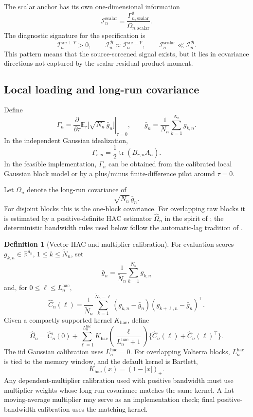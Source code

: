 \documentclass[11pt,a4paper]{amsart}
\theoremstyle{plain}
\theoremstyle{definition}
\newtheorem{definition}[theorem]{Definition}
\theoremstyle{remark}
\DeclareMathOperator{\tr}{tr}
\newcommand{\R}{\mathbb{R}}
\newcommand{\EE}{\mathbb{E}}
\newcommand{\scrB}{\mathcal{B}}
\newcommand{\scrI}{\mathcal{I}}
\begin{document}
The scalar anchor has its own one-dimensional information
\[
        \scrI_n^{\mathrm{scalar}}
        =
        \frac{\Gamma_{n,\mathrm{scalar}}^2}{\Omega_{n,\mathrm{scalar}}}.
\]
The diagnostic signature for the specification is
\[
        \scrI_n^{\mathrm{src}\perp Y}>0,
        \qquad
        \scrI_n^{\scrB}\approx \scrI_n^{\mathrm{src}\perp Y},
        \qquad
        \scrI_n^{\mathrm{scalar}}\ll \scrI_n^{\scrB}.
\]
This pattern means that the source-screened signal exists, but it lies in covariance directions not
captured by the scalar residual-product moment.

\subsection{Local loading and long-run covariance}

Define
\[
        \Gamma_n
        =
        \left.
        \frac{\partial}{\partial\tau}
        \EE_{\tau}
        \bigl[
        \sqrt{N_n}\,\bar g_n
        \bigr]
        \right|_{\tau=0},
        \qquad
        \bar g_n=\frac1{N_n}\sum_{k=1}^{N_n}g_{k,n}.
\]
In the independent Gaussian idealization,
\[
        \Gamma_{r,n}
        =
        \frac12\tr(B_{r,n}A_n).
\]
In the feasible implementation, \(\Gamma_n\) can be obtained from the calibrated local Gaussian
block model or by a plus/minus finite-difference pilot around \(\tau=0\).

Let \(\Omega_n\) denote the long-run covariance of
\[
        \sqrt{N_n}\,\bar g_n.
\]
For disjoint blocks this is the one-block covariance.  For overlapping raw blocks it is estimated by
a positive-definite HAC estimator \(\widehat\Omega_n\) in the spirit of
\cite{neweywest1987hac,andrews1991hac}; the deterministic bandwidth rules used below follow the
automatic-lag tradition of \cite{neweywest1994automatic}.

\begin{definition}[Vector HAC and multiplier calibration]\label{def:vector-hac}
For evaluation scores \(g_{k,n}\in\R^{d_n}\), \(1\le k\le \widetilde N_n\), set
\[
        \bar g_n
        =
        \frac1{\widetilde N_n}\sum_{k=1}^{\widetilde N_n}g_{k,n}
\]
and, for \(0\le\ell\le L_n^{\mathrm{hac}}\),
\[
        \widehat C_n(\ell)
        =
        \frac1{\widetilde N_n}
        \sum_{k=1}^{\widetilde N_n-\ell}
        (g_{k,n}-\bar g_n)(g_{k+\ell,n}-\bar g_n)^\top .
\]
Given a compactly supported kernel \(K_{\mathrm{hac}}\), define
\[
        \widehat\Omega_n
        =
        \widehat C_n(0)
        +
        \sum_{\ell=1}^{L_n^{\mathrm{hac}}}
        K_{\mathrm{hac}}\!\left(\frac{\ell}{L_n^{\mathrm{hac}}+1}\right)
        \{\widehat C_n(\ell)+\widehat C_n(\ell)^\top\}.
\]
The iid Gaussian calibration uses \(L_n^{\mathrm{hac}}=0\).  For overlapping Volterra blocks,
\(L_n^{\mathrm{hac}}\) is tied to the memory window, and the default kernel is Bartlett,
\[
        K_{\mathrm{hac}}(x)=(1-|x|)_+.
\]
Any dependent-multiplier calibration used with positive bandwidth must use multiplier weights whose
long-run covariance matches the same kernel.  A flat moving-average multiplier may serve as an
implementation check; final positive-bandwidth calibration uses the matching kernel.
\end{definition}
\end{document}
